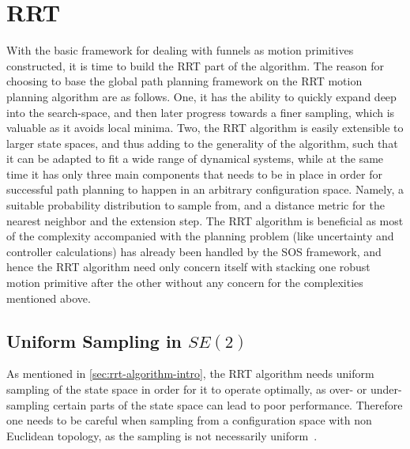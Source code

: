 \section{RRT}
\label{sec:RRT}

With the basic framework for dealing with funnels as motion primitives
constructed, it is time to build the \ac{RRT} part of the \rrtfunnel{}
algorithm. The reason for choosing to base the global path planning framework on
the \ac{RRT} motion planning algorithm are as follows. One, it has the ability
to quickly expand deep into the search-space, and then later progress towards a
finer sampling, which is valuable as it avoids local minima. Two, the \ac{RRT}
algorithm is easily extensible to larger state spaces, and thus adding to the
generality of the \rrtfunnel{} algorithm, such that it can be adapted to fit a
wide range of dynamical systems, while at the same time it has only three main
components that needs to be in place in order for successful path planning to
happen in an arbitrary configuration space. Namely, a suitable probability
distribution to sample from, and a distance metric for the nearest neighbor and
the extension step. The \ac{RRT} algorithm is beneficial as most of the
complexity accompanied with the planning problem (like uncertainty and
controller calculations) has already been handled by the \ac{SOS} framework, and
hence the \ac{RRT} algorithm need only concern itself with stacking one robust
motion primitive after the other without any concern for the complexities
mentioned above.

\subsection{Uniform Sampling in \(SE(2)\)}

As mentioned in \cref{sec:rrt-algorithm-intro}, the \ac{RRT} algorithm
needs uniform sampling of the state space in order for it to operate optimally,
as over- or under-sampling certain parts of the state space can lead to poor
performance. Therefore one needs to be careful when sampling from a
configuration space with non Euclidean topology, as the sampling is not
necessarily uniform~\cite{kuffnerEffectiveSamplingDistance2004}.


